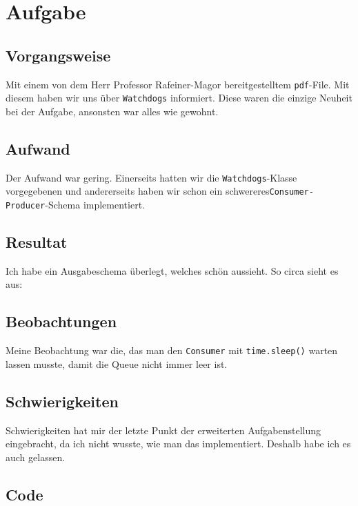 
\section{Aufgabe}
\subsection{Vorgangsweise}
Mit einem von dem Herr Professor Rafeiner-Magor bereitgestelltem \verb|pdf|-File. Mit diesem haben wir uns über \verb|Watchdogs| informiert. Diese waren die einzige Neuheit bei der Aufgabe, ansonsten war alles wie gewohnt.
\subsection{Aufwand}
Der Aufwand war gering. Einerseits hatten wir die \verb|Watchdogs|-Klasse vorgegebenen und andererseits haben wir schon ein \glqq schwereres\grqq\space \verb|Consumer-Producer|-Schema implementiert.
\subsection{Resultat}
Ich habe ein Ausgabeschema überlegt, welches schön aussieht. So circa sieht es aus:

\subsection{Beobachtungen}
Meine Beobachtung war die, das man den \verb|Consumer| mit \verb|time.sleep()| warten lassen musste, damit die Queue nicht immer leer ist.
\subsection{Schwierigkeiten}
Schwierigkeiten hat mir der letzte Punkt der erweiterten Aufgabenstellung eingebracht, da ich nicht wusste, wie man das implementiert. Deshalb habe ich es auch gelassen.\clearpage
\subsection{Code}
\clearpage
\clearpage
\clearpage
